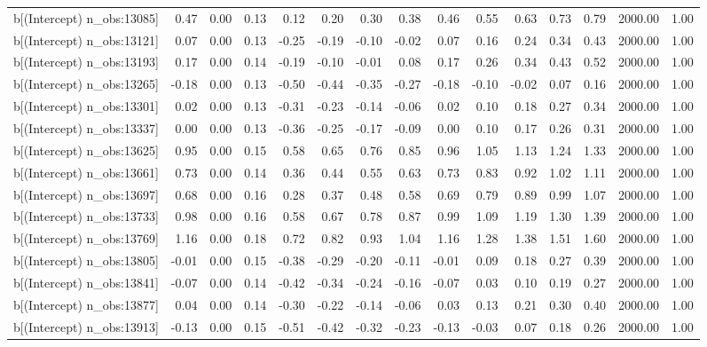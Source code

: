 \begin{table}[ht]
\begin{tabular}{rrrrrrrrrrrrrrr}
  b[(Intercept) n\_obs:13085] & 0.47 & 0.00 & 0.13 & 0.12 & 0.20 & 0.30 & 0.38 & 0.46 & 0.55 & 0.63 & 0.73 & 0.79 & 2000.00 & 1.00 \\ 
  b[(Intercept) n\_obs:13121] & 0.07 & 0.00 & 0.13 & -0.25 & -0.19 & -0.10 & -0.02 & 0.07 & 0.16 & 0.24 & 0.34 & 0.43 & 2000.00 & 1.00 \\ 
  b[(Intercept) n\_obs:13193] & 0.17 & 0.00 & 0.14 & -0.19 & -0.10 & -0.01 & 0.08 & 0.17 & 0.26 & 0.34 & 0.43 & 0.52 & 2000.00 & 1.00 \\ 
  b[(Intercept) n\_obs:13265] & -0.18 & 0.00 & 0.13 & -0.50 & -0.44 & -0.35 & -0.27 & -0.18 & -0.10 & -0.02 & 0.07 & 0.16 & 2000.00 & 1.00 \\ 
  b[(Intercept) n\_obs:13301] & 0.02 & 0.00 & 0.13 & -0.31 & -0.23 & -0.14 & -0.06 & 0.02 & 0.10 & 0.18 & 0.27 & 0.34 & 2000.00 & 1.00 \\ 
  b[(Intercept) n\_obs:13337] & 0.00 & 0.00 & 0.13 & -0.36 & -0.25 & -0.17 & -0.09 & 0.00 & 0.10 & 0.17 & 0.26 & 0.31 & 2000.00 & 1.00 \\ 
  b[(Intercept) n\_obs:13625] & 0.95 & 0.00 & 0.15 & 0.58 & 0.65 & 0.76 & 0.85 & 0.96 & 1.05 & 1.13 & 1.24 & 1.33 & 2000.00 & 1.00 \\ 
  b[(Intercept) n\_obs:13661] & 0.73 & 0.00 & 0.14 & 0.36 & 0.44 & 0.55 & 0.63 & 0.73 & 0.83 & 0.92 & 1.02 & 1.11 & 2000.00 & 1.00 \\ 
  b[(Intercept) n\_obs:13697] & 0.68 & 0.00 & 0.16 & 0.28 & 0.37 & 0.48 & 0.58 & 0.69 & 0.79 & 0.89 & 0.99 & 1.07 & 2000.00 & 1.00 \\ 
  b[(Intercept) n\_obs:13733] & 0.98 & 0.00 & 0.16 & 0.58 & 0.67 & 0.78 & 0.87 & 0.99 & 1.09 & 1.19 & 1.30 & 1.39 & 2000.00 & 1.00 \\ 
  b[(Intercept) n\_obs:13769] & 1.16 & 0.00 & 0.18 & 0.72 & 0.82 & 0.93 & 1.04 & 1.16 & 1.28 & 1.38 & 1.51 & 1.60 & 2000.00 & 1.00 \\ 
  b[(Intercept) n\_obs:13805] & -0.01 & 0.00 & 0.15 & -0.38 & -0.29 & -0.20 & -0.11 & -0.01 & 0.09 & 0.18 & 0.27 & 0.39 & 2000.00 & 1.00 \\ 
  b[(Intercept) n\_obs:13841] & -0.07 & 0.00 & 0.14 & -0.42 & -0.34 & -0.24 & -0.16 & -0.07 & 0.03 & 0.10 & 0.19 & 0.27 & 2000.00 & 1.00 \\ 
  b[(Intercept) n\_obs:13877] & 0.04 & 0.00 & 0.14 & -0.30 & -0.22 & -0.14 & -0.06 & 0.03 & 0.13 & 0.21 & 0.30 & 0.40 & 2000.00 & 1.00 \\ 
  b[(Intercept) n\_obs:13913] & -0.13 & 0.00 & 0.15 & -0.51 & -0.42 & -0.32 & -0.23 & -0.13 & -0.03 & 0.07 & 0.18 & 0.26 & 2000.00 & 1.00 \\ 

\end{tabular}
\end{table}
